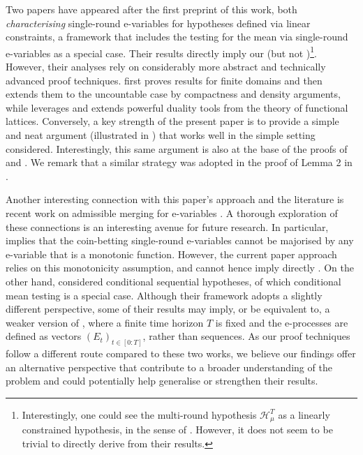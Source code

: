 \documentclass[3p, authoryear, 10pt]{elsarticle}%
\newcommand{\Hh}{\mathcal H}
\begin{document}
Two papers \citep{clerico24optimal, larsson2025evariables} have appeared after the first preprint of this work, both  \emph{characterising} single-round e-variables for hypotheses defined via linear constraints, a framework that includes the testing for the mean via single-round e-variables as a special case. Their results directly imply our  (but not )\footnote{Interestingly, one could see the multi-round hypothesis $\Hh_\mu^T$ as a linearly constrained hypothesis, in the sense of \cite{larsson2025evariables}. However, it does not seem to be trivial to directly derive  from their results.}. However, their analyses rely on considerably more abstract and technically advanced proof techniques. \cite{clerico24optimal} first proves results for finite domains and then extends them to the uncountable case by compactness and density arguments, while \cite{larsson2024numeraire} leverages and extends powerful duality tools from the theory of functional lattices. Conversely, a key strength of the present paper is to provide a simple and neat argument (illustrated in ) that works well in the simple setting considered.  Interestingly, this same argument is also at the base of the proofs of  and . We  remark that a similar strategy was adopted in the proof of Lemma 2 in \cite{wang2025only}. 

Another interesting connection with this paper's approach and the literature is recent work on admissible merging for e-variables \citep{vovk24merging, wang2025only}.  A thorough exploration of these connections is an interesting avenue for future research. In particular, \cite{wang2025only} implies that the coin-betting single-round e-variables cannot be majorised by any e-variable that is a monotonic function. However, the current paper approach relies on this monotonicity assumption, and cannot hence imply directly . On the other hand,
\cite{vovk24merging} considered conditional sequential hypotheses, of which conditional mean testing is a special case. Although their framework adopts a slightly different perspective, some of their results may imply, or be equivalent to, a  weaker version of , where a finite time horizon $T$ is fixed and the e-processes are defined as vectors $(E_t)_{t\in[0:T]}$, rather than sequences. As our proof techniques follow a different route compared to these two works, we believe our findings offer an alternative perspective that contribute to a broader understanding of the problem and could potentially help generalise or strengthen their results.
\end{document}
